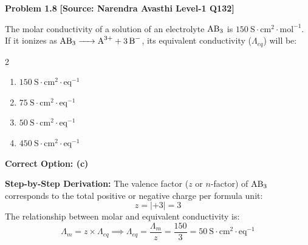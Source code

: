 \begin{problembox}
\textbf{Problem 1.8} \hfill \textbf{[Source: Narendra Avasthi Level-1 Q132]}

The molar conductivity of a solution of an electrolyte $\ce{AB3}$ is $150\ \text{S}\cdot\text{cm}^2\cdot\text{mol}^{-1}$. If it ionizes as $\ce{AB3 -> A^3+ + 3B^-}$, its equivalent conductivity ($\Lambda_{eq}$) will be:
\begin{multicols}{2}
\begin{enumerate}[label=(\alph*)]
    \item $150\ \text{S}\cdot\text{cm}^2\cdot\text{eq}^{-1}$
    \item $75\ \text{S}\cdot\text{cm}^2\cdot\text{eq}^{-1}$
    \item $50\ \text{S}\cdot\text{cm}^2\cdot\text{eq}^{-1}$
    \item $450\ \text{S}\cdot\text{cm}^2\cdot\text{eq}^{-1}$
\end{enumerate}
\end{multicols}
\end{problembox}
\begin{solution}
\textbf{Correct Option: (c)}

\textbf{Step-by-Step Derivation:}
The valence factor ($z$ or $n$-factor) of $\ce{AB3}$ corresponds to the total positive or negative charge per formula unit:
\begin{equation*}
    z = |+3| = 3
\end{equation*}
The relationship between molar and equivalent conductivity is:
\begin{equation*}
    \Lambda_m = z \times \Lambda_{eq} \implies \Lambda_{eq} = \frac{\Lambda_m}{z} = \frac{150}{3} = 50\ \text{S}\cdot\text{cm}^2\cdot\text{eq}^{-1}
\end{equation*}
\end{solution}

